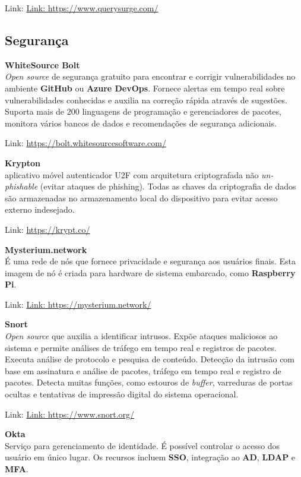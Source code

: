\documentclass[fleqn,10pt]{SelfArx} %
\begin{document}
Link: \url{Link: https://www.querysurge.com/}

\subsection*{Segurança}

\textbf{WhiteSource Bolt} \\
\textit{Open source} de segurança gratuito para encontrar e corrigir vulnerabilidades no ambiente \textbf{GitHub} ou \textbf{Azure DevOps}. Fornece alertas em tempo real sobre vulnerabilidades conhecidas e auxilia na correção rápida através de sugestões. Suporta mais de 200 linguagens de programação e gerenciadores de pacotes, monitora vários bancos de dados e recomendações de segurança adicionais.

Link: \url{https://bolt.whitesourcesoftware.com/}

\textbf{Krypton} \\
aplicativo móvel autenticador U2F com arquitetura criptografada não \textit{un-phishable} (evitar ataques de phishing). Todas as chaves da criptografia de dados são armazenadas no armazenamento local do dispositivo para evitar acesso externo indesejado.

Link: \url{https://krypt.co/}

\textbf{Mysterium.network} \\
É uma rede de nós que fornece privacidade e segurança aos usuários finais. Esta imagem de nó é criada para hardware de sistema embarcado, como \textbf{Raspberry Pi}.

Link: \url{Link: https://mysterium.network/}

\textbf{Snort} \\
\textit{Open source} que auxilia a identificar intrusos. Expõe ataques maliciosos ao sistema e permite análises de tráfego em tempo real e registros de pacotes. Executa análise de protocolo e pesquisa de conteúdo. Detecção da intrusão com base em assinatura e análise de pacotes, tráfego em tempo real e registro de pacotes. Detecta muitas funções, como estouros de \textit{buffer}, varreduras de portas ocultas e tentativas de impressão digital do sistema operacional.

Link: \url{Link: https://www.snort.org/}

\textbf{Okta} \\
Serviço para gerenciamento de identidade. É possível controlar o acesso dos usuário em único lugar. Os recursos incluem \textbf{SSO}, integração ao \textbf{AD}, \textbf{LDAP} e \textbf{MFA}.
\end{document}
